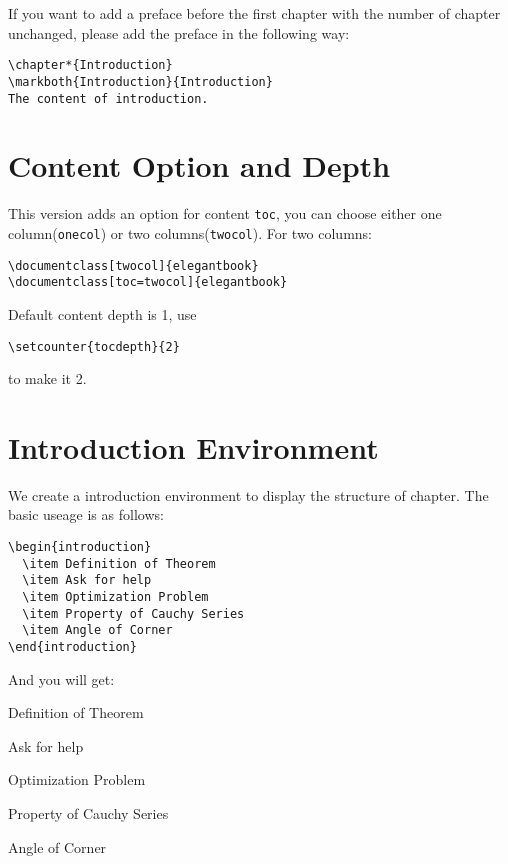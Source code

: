 \documentclass[11pt]{elegantbook}
\begin{document}
If you want to add a preface before the first chapter with the number of chapter unchanged, please add the preface in the following way:
\begin{lstlisting}
\chapter*{Introduction}
\markboth{Introduction}{Introduction}
The content of introduction.
\end{lstlisting}

\section{Content Option and Depth}
This version adds an option for content \lstinline{toc}, you can  choose either one column(\lstinline{onecol}) or two columns(\lstinline{twocol}). For two columns:
\begin{lstlisting}
\documentclass[twocol]{elegantbook}
\documentclass[toc=twocol]{elegantbook}
\end{lstlisting}

Default content depth is 1, use
\begin{lstlisting}
\setcounter{tocdepth}{2}
\end{lstlisting}
to make it 2.


\section{Introduction Environment}
We create a introduction environment to display the structure of chapter. The basic useage is as follows:
\begin{lstlisting}
\begin{introduction}
  \item Definition of Theorem
  \item Ask for help
  \item Optimization Problem
  \item Property of Cauchy Series
  \item Angle of Corner
\end{introduction}
\end{lstlisting}
And you will get:
\begin{introduction}
  \item Definition of Theorem
  \item Ask for help
  \item Optimization Problem
  \item Property of Cauchy Series
  \item Angle of Corner
\end{introduction}
\end{document}
